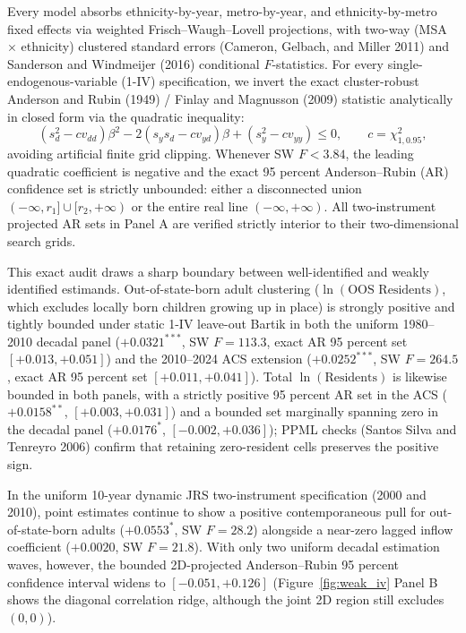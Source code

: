 \documentclass[11pt]{article}
\begin{document}
Every model absorbs ethnicity-by-year, metro-by-year, and ethnicity-by-metro fixed effects via weighted Frisch--Waugh--Lovell projections, with two-way (MSA $\times$ ethnicity) clustered standard errors (Cameron, Gelbach, and Miller 2011) and Sanderson and Windmeijer (2016) conditional $F$-statistics. For every single-endogenous-variable (1-IV) specification, we invert the exact cluster-robust Anderson and Rubin (1949) / Finlay and Magnusson (2009) statistic analytically in closed form via the quadratic inequality:
\begin{equation}
(s_d^2 - c v_{dd})\beta^2 - 2(s_y s_d - c v_{yd})\beta + (s_y^2 - c v_{yy}) \le 0, \qquad c = \chi^2_{1,0.95},
\end{equation}
avoiding artificial finite grid clipping. Whenever SW $F < 3.84$, the leading quadratic coefficient is negative and the exact 95 percent Anderson--Rubin (AR) confidence set is strictly unbounded: either a disconnected union $(-\infty, r_1] \cup [r_2, +\infty)$ or the entire real line $(-\infty, +\infty)$. All two-instrument projected AR sets in Panel A are verified strictly interior to their two-dimensional search grids.



This exact audit draws a sharp boundary between well-identified and weakly identified estimands. Out-of-state-born adult clustering ($\ln(\text{OOS Residents})$, which excludes locally born children growing up in place) is strongly positive and tightly bounded under static 1-IV leave-out Bartik in both the uniform 1980--2010 decadal panel ($+0.0321^{***}$, SW $F = 113.3$, exact AR 95 percent set $[+0.013, +0.051]$) and the 2010--2024 ACS extension ($+0.0252^{***}$, SW $F = 264.5$, exact AR 95 percent set $[+0.011, +0.041]$). Total $\ln(\text{Residents})$ is likewise bounded in both panels, with a strictly positive 95 percent AR set in the ACS ($+0.0158^{**}$, $[+0.003, +0.031]$) and a bounded set marginally spanning zero in the decadal panel ($+0.0176^{*}$, $[-0.002, +0.036]$); PPML checks (Santos Silva and Tenreyro 2006) confirm that retaining zero-resident cells preserves the positive sign.

In the uniform 10-year dynamic JRS two-instrument specification (2000 and 2010), point estimates continue to show a positive contemporaneous pull for out-of-state-born adults ($+0.0553^{*}$, SW $F = 28.2$) alongside a near-zero lagged inflow coefficient ($+0.0020$, SW $F = 21.8$). With only two uniform decadal estimation waves, however, the bounded 2D-projected Anderson--Rubin 95 percent confidence interval widens to $[-0.051, +0.126]$ (Figure~\ref{fig:weak_iv} Panel B shows the diagonal correlation ridge, although the joint 2D region still excludes $(0,0)$).
\end{document}
